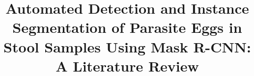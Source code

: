 \documentclass[conference]{IEEEtran}
\begin{document}
\title{Automated Detection and Instance Segmentation of Parasite Eggs in Stool Samples Using Mask R-CNN: A Literature Review}

\author{}

\maketitle









\printbibliography
\end{document}

